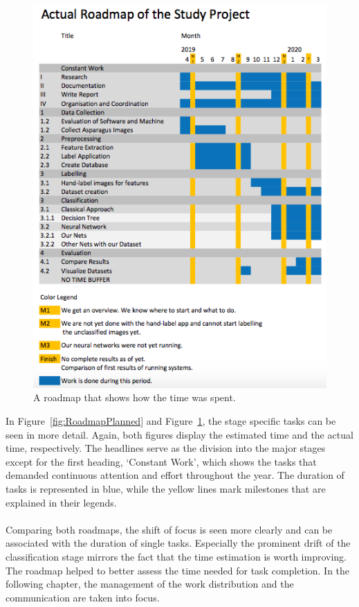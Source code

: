 \begin{figure}[h]
	\centering
	\includegraphics[scale=0.5]{Figures/chapter02/roadmap_actual}
	\decoRule
	\caption[Actual Roadmap]{A roadmap that shows how the time was spent.}
	\label{fig:RoadmapActual}
\end{figure}

In Figure~\ref{fig:RoadmapPlanned} and Figure~\ref{fig:RoadmapActual}, the stage specific tasks can be seen in more detail. Again, both figures display the estimated time and the actual time, respectively. The headlines serve as the division into the major stages except for the first heading, ‘Constant Work’, which shows the tasks that demanded continuous attention and effort throughout the year. The duration of tasks is represented in blue, while the yellow lines mark milestones that are explained in their legends. \\
\\
Comparing both roadmaps, the shift of focus is seen more clearly and can be associated with the duration of single tasks. Especially the prominent drift of the classification stage mirrors the fact that the time estimation is worth improving. The roadmap helped to better assess the time needed for task completion.
In the following chapter, the management of the work distribution and the communication are taken into focus.


